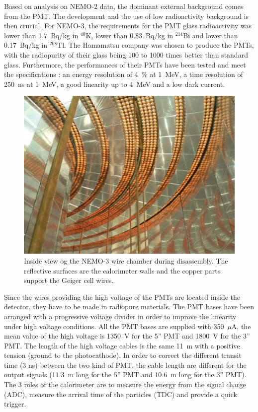 \documentclass[main.tex]{subfiles}
\begin{document}
\bigskip


\NI Based on analysis on NEMO-2 data, the dominant external background comes from the PMT. The development and the use of low radioactivity background is then crucial. For NEMO-3, the requirements for the PMT glass radioactivity was lower than 1.7~Bq/kg in $^{\text{40}}$K, lower than 0.83~Bq/kg in $^{\text{214}}$Bi and lower than 0.17~Bq/kg in $^{\text{208}}$Tl. The Hamamatsu company was chosen to produce the PMTs, with the radiopurity of their glass being 100 to 1000 times better than standard glass. Furthermore, the performances of their PMTs have been tested and meet the specifications : an energy resolution of 4~\% at 1~MeV, a time resolution of 250~ns at 1~MeV, a good linearity up to 4~MeV and a low dark current.  


\begin{figure}[h!]
\begin{center}
\includegraphics[scale=0.75]{pictures/Chap3/NEMO3Inside.jpg}
\caption{Inside view og the NEMO-3 wire chamber during disassembly. The reflective surfaces are the calorimeter walls and the copper parts support the Geiger cell wires.}
\label{NEMO3Inside}
\end{center}
\end{figure}



\NI Since the wires providing the high voltage of the PMTs are located inside the detector, they have to be made in radiopure materials. The PMT bases have been arranged with a progressive voltage divider in order to improve the linearity under high voltage conditions. All the PMT bases are supplied with 350~$\mu$A, the mean value of the high voltage is 1350~V for the 5'' PMT and 1800~V for the 3'' PMT. The length of the high voltage cables is the same 11~m with a positive tension (ground to the photocathode). In order to correct the different transit time (3 ns) between the two kind of PMT, the cable length are different for the output signals (11.3~m long for the 5'' PMT and 10.6~m long for the 3'' PMT). The 3 roles of the calorimeter are to measure the energy from the signal charge (ADC), measure the arrival time of the particles (TDC) and provide a quick trigger.
\end{document}
